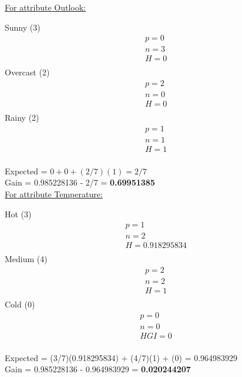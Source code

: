 \documentclass[8pt, fullpage,letterpaper]{article}
\begin{document}
\begin{enumerate}
\begin{enumerate}
\begin{enumerate}
\begin{enumerate}
\begin{itemize}
						\underline {For attribute Outlook:} 
							\vspace{-5pt}
							\begin{multicols}{3}
								Sunny (3)
			 						\begin{align*}
									    	& p = 0\\
										& n = 3 \\
									    	& H = 0\\
								      \end{align*}
								Overcast (2)
			 						\begin{align*}
									    	& p = 2\\
										& n = 0 \\
									    	& H = 0\\
								      \end{align*}
								Rainy (2)
			 						\begin{align*}
									    	& p = 1\\
										& n = 1 \\
									    	& H = 1\\
								      \end{align*}
							\end{multicols}
							\vspace{-20pt}
							Expected = $0+0+(2/7)(1) = 2/7$\\
							Gain = 0.985228136 - 2/7 = {\bf 0.69951385}\\

						\underline {For attribute Temperature:} 
							\vspace{-5pt}
							\begin{multicols}{3}
								Hot (3)
			 						\begin{align*}
									    	& p = 1\\
										& n = 2 \\
									    	& H = 0.918295834\\
								      \end{align*}
								Medium (4)
			 						\begin{align*}
									    	& p = 2\\
										& n = 2 \\
									    	& H = 1\\
								      \end{align*}
								Cold (0)
			 						\begin{align*}
									    	& p = 0\\
										& n = 0 \\
									    	&HGI = 0\\
								      \end{align*}
							\end{multicols}
							\vspace{-20pt}
							Expected = (3/7)(0.918295834) + (4/7)(1) + (0) = 0.964983929\\
							Gain = 0.985228136 - 0.964983929 = {\bf 0.020244207}\\


\end{itemize}
\end{enumerate}
\end{enumerate}
\end{enumerate}
\end{enumerate}
\end{document}
